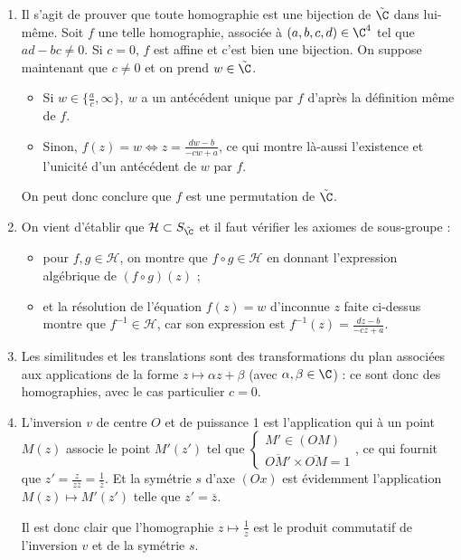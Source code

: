 \begin{enumerate}
 \item Il s'agit de prouver que toute homographie est une bijection de $\tilde{\C}$ dans lui-même. Soit $f$ une telle homographie, associée à $(a,b,c,d)\in \C^4$ tel que $ad-bc\neq 0$. Si $c=0$, $f$ est affine et c'est bien une bijection. On suppose maintenant que $c\neq 0$ et on prend $w\in \tilde{\C}$.
 \begin{itemize}
  \item Si $w\in \{\frac{a}{c}, \infty\},~ w$ a un antécédent unique par $f$ d'après la définition même de $f$.
  \item Sinon, $f(z) = w\iff z = \frac{dw-b}{-cw + a}$, ce qui montre là-aussi l'existence et l'unicité d'un antécédent de $w$ par $f$.
 \end{itemize}
On peut donc conclure que $f$ est une permutation de  $\tilde{\C}$.

\item On vient d'établir que $\mathcal{H} \subset S_{\tilde{\C}}$ et il faut vérifier les axiomes de sous-groupe :
\begin{itemize}
 \item pour $f,g\in \mathcal{H}$, on montre que $f\circ g \in \mathcal{H} $ en donnant l'expression algébrique de $(f\circ g)(z)$ ;
 \item et la résolution de l'équation $f(z) =w$ d'inconnue $z$ faite ci-dessus montre que $f^{-1} \in \mathcal{H}$, car son expression est $f^{-1}(z) = \frac{dz-b}{-cz + a}$.
\end{itemize}

\item Les similitudes et les translations sont des transformations du plan associées aux applications de la forme $z\mapsto \alpha z + \beta$ (avec $\alpha, \beta \in \C$) : ce sont donc des homographies, avec le cas particulier $c=0$.

\item L'inversion $v$ de centre $O$ et de puissance 1 est l'application qui à un point $M(z)$ associe le point $M'(z')$ tel que $\begin{cases} M' \in (OM)\\ \overline{OM'}\times \overline{OM} = 1\end{cases} $, ce qui fournit que $z' = \frac{z}{z\overline{z}} = \frac{1}{\overline{z}}$. Et la symétrie $s$ d'axe $(Ox)$ est évidemment l'application $M(z) \mapsto M'(z')$ telle que $z' = \overline{z}$.

Il est donc clair que l'homographie $z\mapsto\frac{1}{z}$ est le produit commutatif de l'inversion $v$ et de la symétrie $s$.


\end{enumerate}
